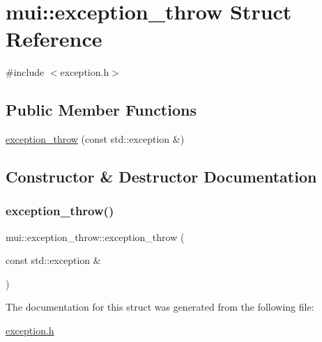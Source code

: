 \hypertarget{structmui_1_1exception__throw}{}\section{mui\+:\+:exception\+\_\+throw Struct Reference}
\label{structmui_1_1exception__throw}


{\ttfamily \#include $<$exception.\+h$>$}

\subsection*{Public Member Functions}
\begin{DoxyCompactItemize}
\item 
\hyperlink{structmui_1_1exception__throw_a611d5d1ba748145c3eed906040304dd7}{exception\+\_\+throw} (const std\+::exception \&)
\end{DoxyCompactItemize}


\subsection{Constructor \& Destructor Documentation}
\mbox{\label{structmui_1_1exception__throw_a611d5d1ba748145c3eed906040304dd7}} 
\subsubsection{\texorpdfstring{exception\+\_\+throw()}{exception\_throw()}}
{\footnotesize\ttfamily mui\+::exception\+\_\+throw\+::exception\+\_\+throw (\begin{DoxyParamCaption}\item[{const std\+::exception \&}]{ }\end{DoxyParamCaption})\hspace{0.3cm}{\ttfamily [inline]}}



The documentation for this struct was generated from the following file\+:\begin{DoxyCompactItemize}
\item 
\hyperlink{exception_8h}{exception.\+h}\end{DoxyCompactItemize}
